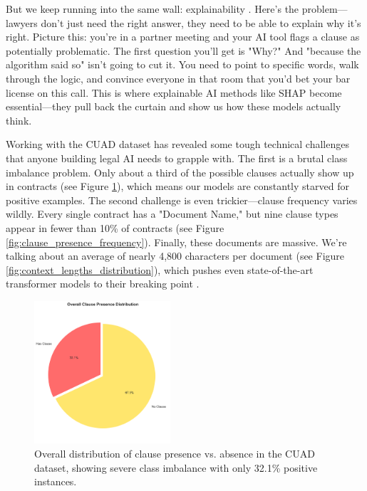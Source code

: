 But we keep running into the same wall: explainability \cite{molnar2020interpretable}. Here's the problem—lawyers don't just need the right answer, they need to be able to explain why it's right. Picture this: you're in a partner meeting and your AI tool flags a clause as potentially problematic. The first question you'll get is "Why?" And "because the algorithm said so" isn't going to cut it. You need to point to specific words, walk through the logic, and convince everyone in that room that you'd bet your bar license on this call. This is where explainable AI methods like SHAP \cite{lundberg2017unified} become essential—they pull back the curtain and show us how these models actually think.

Working with the CUAD dataset has revealed some tough technical challenges that anyone building legal AI needs to grapple with. The first is a brutal class imbalance problem. Only about a third of the possible clauses actually show up in contracts (see Figure \ref{fig:clause_presence_distribution}), which means our models are constantly starved for positive examples. The second challenge is even trickier—clause frequency varies wildly. Every single contract has a "Document Name," but nine clause types appear in fewer than 10\% of contracts (see Figure \ref{fig:clause_presence_frequency}). Finally, these documents are massive. We're talking about an average of nearly 4,800 characters per document (see Figure \ref{fig:context_lengths_distribution}), which pushes even state-of-the-art transformer models to their breaking point \cite{liu2021multilabel}.

\begin{figure}[htbp]
\centering
\includegraphics[width=0.45\textwidth]{../figures/clause_presence_distribution.png}
\caption{Overall distribution of clause presence vs. absence in the CUAD dataset, showing severe class imbalance with only 32.1\% positive instances.}
\label{fig:clause_presence_distribution}
\end{figure}


